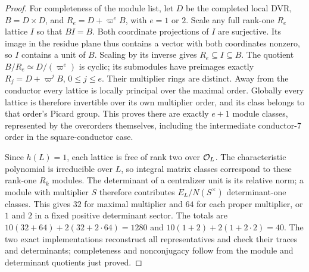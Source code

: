 \begin{proof}
For completeness of the module list, let $D$ be the completed local DVR,
$B=D\times D$, and $R_e=D+\varpi^eB$, with $e=1$ or $2$.
Scale any full rank-one $R_e$ lattice $I$ so that $BI=B$.
Both coordinate projections of $I$ are surjective. Its image in the residue
plane thus contains a vector with both coordinates nonzero, so $I$ contains
a unit of $B$. Scaling by its inverse gives $R_e\subseteq I\subseteq B$.
The quotient $B/R_e\simeq D/(\varpi^e)$ is cyclic; its submodules have
preimages exactly $R_j=D+\varpi^jB$, $0\le j\le e$.
Their multiplier rings are distinct. Away from the conductor every lattice
is locally principal over the maximal order. Globally every lattice is
therefore invertible over its own multiplier order, and its class belongs
to that order's Picard group. This proves there are exactly $e+1$ module
classes, represented by the overorders themselves, including the intermediate
conductor-7 order in the square-conductor case.

Since $h(L)=1$, each lattice is free of rank two over $\mathcal O_L$.
The characteristic polynomial is irreducible over $L$, so integral matrix
classes correspond to these rank-one $R_k$ modules.
The determinant of a centralizer unit is its relative norm; a module with
multiplier $S$ therefore contributes $E_L/N(S^\times)$ determinant-one
classes. This gives $32$ for maximal multiplier and $64$ for each proper
multiplier, or $1$ and $2$ in a fixed positive determinant sector.
The totals are $10(32+64)+2(32+2\cdot64)=1280$ and
$10(1+2)+2(1+2\cdot2)=40$.
The two exact implementations reconstruct all representatives and check
their traces and determinants; completeness and nonconjugacy follow from
the module and determinant quotients just proved.
\end{proof}

